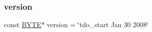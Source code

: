 \mbox{\label{tdo__start_8_c_a0f1d0e4d3d22d72be50dfaa5f7f59b72}} 
\subsubsection{\texorpdfstring{version}{version}}
{\footnotesize\ttfamily const \mbox{\hyperlink{galois_8h_ab6cc7b4aeb6ea31aba2b3fbfc83ff5e6}{B\+Y\+TE}}$\ast$ version = \char`\"{}tdo\+\_\+start Jan 30 2008\char`\"{}}

